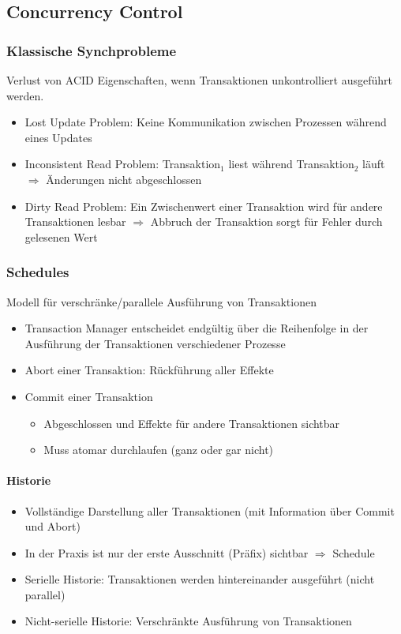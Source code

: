 \documentclass[ngerman]{scrartcl}
\begin{document}
\subsection{Concurrency Control}
\subsubsection*{Klassische Synchprobleme}
Verlust von ACID Eigenschaften, wenn Transaktionen unkontrolliert ausgeführt werden.
\begin{itemize}
  \item Lost Update Problem: Keine Kommunikation zwischen Prozessen während eines Updates
  \item Inconsistent Read Problem: Transaktion$ _1 $ liest während Transaktion$ _2 $ läuft $ \Rightarrow $ Änderungen nicht abgeschlossen 
  \item Dirty Read Problem: Ein Zwischenwert einer Transaktion wird für andere Transaktionen lesbar $ \Rightarrow $ Abbruch der Transaktion sorgt für Fehler durch gelesenen Wert 
\end{itemize}

\subsubsection*{Schedules}
Modell für verschränke/parallele Ausführung von Transaktionen
\begin{itemize}
  \item Transaction Manager entscheidet endgültig über die Reihenfolge in der Ausführung der Transaktionen verschiedener Prozesse
  \item Abort einer Transaktion: Rückführung aller Effekte
  \item Commit einer Transaktion
  \begin{itemize}
    \item Abgeschlossen und Effekte für andere Transaktionen sichtbar 
    \item Muss atomar durchlaufen (ganz oder gar nicht)
  \end{itemize}
\end{itemize} 
\paragraph*{Historie}
\begin{itemize}
  \item Vollständige Darstellung aller Transaktionen (mit Information über Commit und Abort) 
  \item In der Praxis ist nur der erste Ausschnitt (Präfix) sichtbar $ \Rightarrow $ Schedule
  \item Serielle Historie: Transaktionen werden hintereinander ausgeführt (nicht parallel)
  \item Nicht-serielle Historie: Verschränkte Ausführung von Transaktionen 
\end{itemize}
\end{document}
